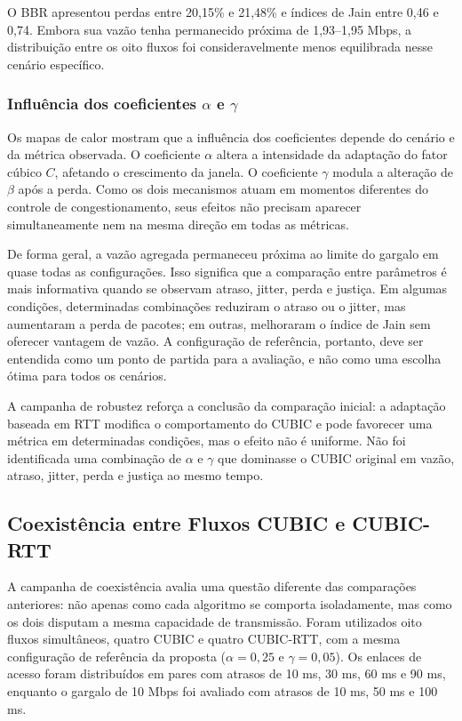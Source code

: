 \documentclass[a4paper,12pt]{monografia}
\begin{document}
O BBR apresentou perdas entre 20,15\% e 21,48\% e índices de Jain entre 0,46 e 0,74. Embora sua vazão tenha permanecido próxima de 1,93--1,95 Mbps, a distribuição entre os oito fluxos foi consideravelmente menos equilibrada nesse cenário específico.

\subsubsection{Influência dos coeficientes \texorpdfstring{$\alpha$ e $\gamma$}{alpha e gamma}}

Os mapas de calor mostram que a influência dos coeficientes depende do cenário e da métrica observada. O coeficiente $\alpha$ altera a intensidade da adaptação do fator cúbico $C$, afetando o crescimento da janela. O coeficiente $\gamma$ modula a alteração de $\beta$ após a perda. Como os dois mecanismos atuam em momentos diferentes do controle de congestionamento, seus efeitos não precisam aparecer simultaneamente nem na mesma direção em todas as métricas.

De forma geral, a vazão agregada permaneceu próxima ao limite do gargalo em quase todas as configurações. Isso significa que a comparação entre parâmetros é mais informativa quando se observam atraso, jitter, perda e justiça. Em algumas condições, determinadas combinações reduziram o atraso ou o jitter, mas aumentaram a perda de pacotes; em outras, melhoraram o índice de Jain sem oferecer vantagem de vazão. A configuração de referência, portanto, deve ser entendida como um ponto de partida para a avaliação, e não como uma escolha ótima para todos os cenários.

A campanha de robustez reforça a conclusão da comparação inicial: a adaptação baseada em RTT modifica o comportamento do CUBIC e pode favorecer uma métrica em determinadas condições, mas o efeito não é uniforme. Não foi identificada uma combinação de $\alpha$ e $\gamma$ que dominasse o CUBIC original em vazão, atraso, jitter, perda e justiça ao mesmo tempo.

\subsection{Coexistência entre Fluxos CUBIC e CUBIC-RTT}

A campanha de coexistência avalia uma questão diferente das comparações anteriores: não apenas como cada algoritmo se comporta isoladamente, mas como os dois disputam a mesma capacidade de transmissão. Foram utilizados oito fluxos simultâneos, quatro CUBIC e quatro CUBIC-RTT, com a mesma configuração de referência da proposta ($\alpha=0{,}25$ e $\gamma=0{,}05$). Os enlaces de acesso foram distribuídos em pares com atrasos de 10 ms, 30 ms, 60 ms e 90 ms, enquanto o gargalo de 10 Mbps foi avaliado com atrasos de 10 ms, 50 ms e 100 ms.
\end{document}
